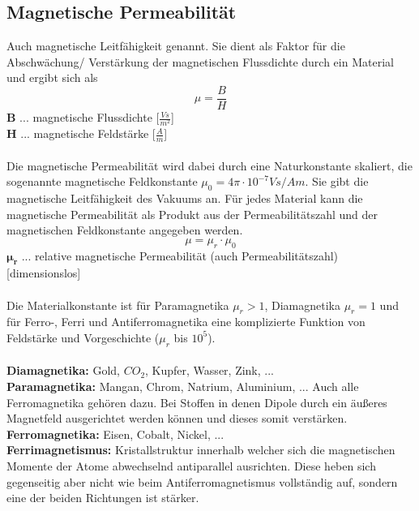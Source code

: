 		\subsection{Magnetische Permeabilität}
			Auch magnetische Leitfähigkeit genannt. Sie dient als Faktor für die Abschwächung/ Verstärkung der magnetischen Flussdichte durch ein Material und ergibt sich als
			\[ \mu = \dfrac{B}{H} \]
			\leavevmode
			\tab[1cm] \textbf{B} \tab ... \tab magnetische Flussdichte [$ \frac{Vs}{m^{2}} $]\\
			\tab[1cm] \textbf{H} \tab ... \tab magnetische Feldstärke [$ \frac{A}{m} $]\\\\
			Die magnetische Permeabilität wird dabei durch eine Naturkonstante skaliert, die sogenannte magnetische Feldkonstante $ \mu_{0} = 4\pi\cdot 10^{-7} Vs/Am $. Sie gibt die magnetische Leitfähigkeit des Vakuums an. Für jedes Material kann die magnetische Permeabilität als Produkt aus der Permeabilitätszahl und der magnetischen Feldkonstante angegeben werden.
			\[ \mu = \mu_{r}\cdot\mu_{0}\]
			\tab[1cm] \textbf{$ \bm{\mu_{r}} $} \tab ... \tab relative magnetische Permeabilität (auch Permeabilitätszahl) [dimensionslos]\\\\
			Die Materialkonstante ist für Paramagnetika $ \mu_{r} > 1 $, Diamagnetika $ \mu_{r} = 1$ und für Ferro-, Ferri und Antiferromagnetika eine komplizierte Funktion von Feldstärke und Vorgeschichte ($ \mu_{r} $ bis $ 10^{5} $).\\\\
			\textbf{Diamagnetika:} Gold, $ CO_{2} $, Kupfer, Wasser, Zink, ... \\
			\textbf{Paramagnetika:} Mangan, Chrom, Natrium, Aluminium, ... Auch alle Ferromagnetika gehören dazu. Bei Stoffen in denen Dipole durch ein äußeres Magnetfeld ausgerichtet werden können und dieses somit verstärken.\\
			\textbf{Ferromagnetika:} Eisen, Cobalt, Nickel, ... \\
			\textbf{Ferrimagnetismus:} Kristallstruktur innerhalb welcher sich die magnetischen Momente der Atome abwechselnd antiparallel ausrichten. Diese heben sich gegenseitig aber nicht wie beim Antiferromagnetismus vollständig auf, sondern eine der beiden Richtungen ist stärker.
			
	
